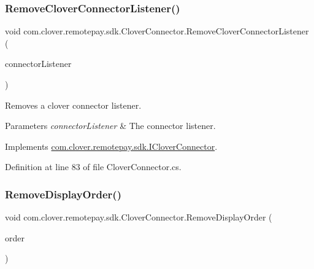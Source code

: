 \subsubsection{\texorpdfstring{Remove\+Clover\+Connector\+Listener()}{RemoveCloverConnectorListener()}}
{\footnotesize\ttfamily void com.\+clover.\+remotepay.\+sdk.\+Clover\+Connector.\+Remove\+Clover\+Connector\+Listener (\begin{DoxyParamCaption}\item[{\hyperlink{interfacecom_1_1clover_1_1remotepay_1_1sdk_1_1_i_clover_connector_listener}{I\+Clover\+Connector\+Listener}}]{connector\+Listener }\end{DoxyParamCaption})}



Removes a clover connector listener. 


\begin{DoxyParams}{Parameters}
{\em connector\+Listener} & The connector listener.\\
\hline
\end{DoxyParams}


Implements \hyperlink{interfacecom_1_1clover_1_1remotepay_1_1sdk_1_1_i_clover_connector_a4acba7cae456cb73a0acf4331cae04f9}{com.\+clover.\+remotepay.\+sdk.\+I\+Clover\+Connector}.



Definition at line 83 of file Clover\+Connector.\+cs.

\mbox{\label{classcom_1_1clover_1_1remotepay_1_1sdk_1_1_clover_connector_af5a1b2bddf01b44eaa40af3f8212451b}} 
\subsubsection{\texorpdfstring{Remove\+Display\+Order()}{RemoveDisplayOrder()}}
{\footnotesize\ttfamily void com.\+clover.\+remotepay.\+sdk.\+Clover\+Connector.\+Remove\+Display\+Order (\begin{DoxyParamCaption}\item[{\hyperlink{classcom_1_1clover_1_1remote_1_1order_1_1_display_order}{Display\+Order}}]{order }\end{DoxyParamCaption})}



